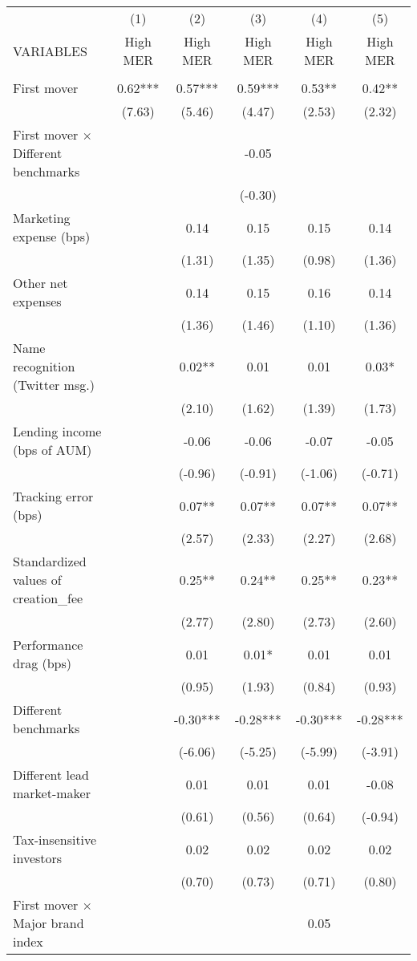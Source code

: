 \documentclass[]{article}
\begin{document}
\begin{tabular}{lccccc} \hline
 & (1) & (2) & (3) & (4) & (5) \\
VARIABLES & High MER & High MER & High MER & High MER & High MER \\ \hline
 &  &  &  &  &  \\
First mover & 0.62*** & 0.57*** & 0.59*** & 0.53** & 0.42** \\
 & (7.63) & (5.46) & (4.47) & (2.53) & (2.32) \\
First mover $\times$ Different benchmarks &  &  & -0.05 &  &  \\
 &  &  & (-0.30) &  &  \\
Marketing expense (bps) &  & 0.14 & 0.15 & 0.15 & 0.14 \\
 &  & (1.31) & (1.35) & (0.98) & (1.36) \\
Other net expenses &  & 0.14 & 0.15 & 0.16 & 0.14 \\
 &  & (1.36) & (1.46) & (1.10) & (1.36) \\
Name recognition (Twitter msg.) &  & 0.02** & 0.01 & 0.01 & 0.03* \\
 &  & (2.10) & (1.62) & (1.39) & (1.73) \\
Lending income (bps of AUM) &  & -0.06 & -0.06 & -0.07 & -0.05 \\
 &  & (-0.96) & (-0.91) & (-1.06) & (-0.71) \\
Tracking error (bps) &  & 0.07** & 0.07** & 0.07** & 0.07** \\
 &  & (2.57) & (2.33) & (2.27) & (2.68) \\
Standardized values of creation\_fee &  & 0.25** & 0.24** & 0.25** & 0.23** \\
 &  & (2.77) & (2.80) & (2.73) & (2.60) \\
Performance drag (bps) &  & 0.01 & 0.01* & 0.01 & 0.01 \\
 &  & (0.95) & (1.93) & (0.84) & (0.93) \\
Different benchmarks &  & -0.30*** & -0.28*** & -0.30*** & -0.28*** \\
 &  & (-6.06) & (-5.25) & (-5.99) & (-3.91) \\
Different lead market-maker &  & 0.01 & 0.01 & 0.01 & -0.08 \\
 &  & (0.61) & (0.56) & (0.64) & (-0.94) \\
Tax-insensitive investors &  & 0.02 & 0.02 & 0.02 & 0.02 \\
 &  & (0.70) & (0.73) & (0.71) & (0.80) \\
First mover $\times$ Major brand index &  &  &  & 0.05 &  \\

\end{tabular}
\end{document}
